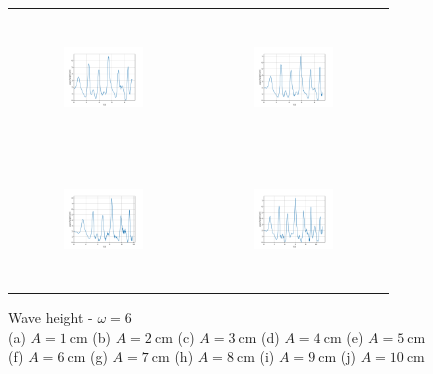 \begin{figure}[H]
\begin{center}
\begin{tabular}{cc}
\includegraphics[width=0.45\textwidth, height=3.5cm]{graph/omega=1.50_A=7_wave.pdf}
&
\includegraphics[width=0.45\textwidth, height=3.5cm]{graph/omega=1.50_A=8_wave.pdf}\\
\includegraphics[width=0.45\textwidth, height=3.5cm]{graph/omega=1.50_A=9_wave.pdf}
&
\includegraphics[width=0.45\textwidth, height=3.5cm]{graph/omega=1.50_A=10_wave.pdf}\\
\end{tabular}
\end{center}
\caption{Wave height - $\omega=6$ \\ (a) $A=1\mathrm{~cm}$ (b) $A=2\mathrm{~cm}$ (c) $A=3\mathrm{~cm}$ (d) $A=4\mathrm{~cm}$ (e) $A=5\mathrm{~cm}$\\(f) $A=6\mathrm{~cm}$ (g) $A=7\mathrm{~cm}$ (h) $A=8\mathrm{~cm}$ (i) $A=9\mathrm{~cm}$ (j) $A=10\mathrm{~cm}$}
\label{Data_omega=6_wave}
\end{figure}

